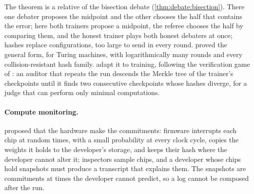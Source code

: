 \begin{refsection}
The theorem is a relative of the bisection debate (\cref{thm:debate:bisection}). There one debater proposes the midpoint and the other chooses the half that contains the error; here both trainers propose a midpoint, the referee chooses the half by comparing them, and the honest trainer plays both honest debaters at once; hashes replace configurations, too large to send in every round. \Textcite{CanettiRivaRothblum2011,CanettiRivaRothblum2013} proved the general form, for Turing machines, with logarithmically many rounds and every collision-resistant hash family. \Textcite{SrivastavaAroraBoneh2024} adapt it to training, following the verification game of \textcite{TeutschReitwiessner2019}: an auditor that repeats the run descends the Merkle tree of the trainer's checkpoints until it finds two consecutive checkpoints whose hashes diverge, for a judge that can perform only minimal computations.

\paragraph{Compute monitoring.} \Textcite{Shavit2023} proposed that the hardware make the commitments: firmware interrupts each chip at random times, with a small probability at every clock cycle, copies the weights it holds to the developer's storage, and keeps their hash where the developer cannot alter it; inspectors sample chips, and a developer whose chips hold snapshots must produce a transcript that explains them. The snapshots are commitments at times the developer cannot predict, so a log cannot be composed after the run.



\end{refsection}
